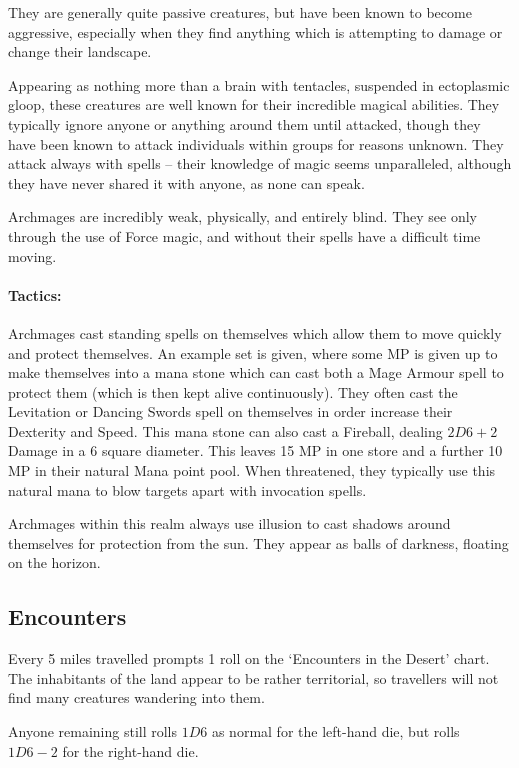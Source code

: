 \begin{multicols}{2}
They are generally quite passive creatures, but have been known to become aggressive, especially when they find anything which is attempting to damage or change their landscape.

\rockman


\label{archmage}

Appearing as nothing more than a brain with tentacles, suspended in ectoplasmic gloop, these creatures are well known for their incredible magical abilities.
They typically ignore anyone or anything around them until attacked, though they have been known to attack individuals within groups for reasons unknown.
They attack always with spells -- their knowledge of magic seems unparalleled, although they have never shared it with anyone, as none can speak.

Archmages are incredibly weak, physically, and entirely blind.
They see only through the use of Force magic, and without their spells have a difficult time moving.

\archmage

\paragraph{Tactics:} Archmages cast standing spells on themselves which allow them to move quickly and protect themselves.
An example set is given, where some MP is given up to make themselves into a mana stone which can cast both a Mage Armour spell to protect them (which is then kept alive continuously).
They often cast the Levitation or Dancing Swords spell on themselves in order increase their Dexterity and Speed.
This mana stone can also cast a Fireball, dealing $2D6+2$ Damage in a 6 square diameter.
This leaves 15 MP in one store and a further 10 MP in their natural Mana point pool.
When threatened, they typically use this natural mana to blow targets apart with invocation spells.

Archmages within this realm always use illusion to cast shadows around themselves for protection from the sun.
They appear as balls of darkness, floating on the horizon.

\subsection{Encounters}

Every 5 miles travelled prompts 1 roll on the `Encounters in the Desert' chart.
The inhabitants of the land appear to be rather territorial, so travellers will not find many creatures wandering into them.

Anyone remaining still rolls $1D6$ as normal for the left-hand die,
but rolls $1D6-2$ for the right-hand die.

\dragon

\end{multicols}

